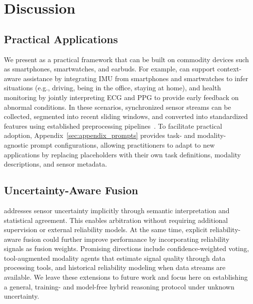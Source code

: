 \section{Discussion}
\label{sec:discussion}

\subsection{Practical Applications}
\label{sec:practical_applications}

We present \system{} as a practical framework that can be built on commodity devices such as smartphones, smartwatches, and earbuds. For example, \system{} can support context-aware assistance by integrating IMU from smartphones and smartwatches to infer situations (e.g., driving, being in the office, staying at home), and health monitoring by jointly interpreting ECG and PPG to provide early feedback on abnormal conditions. In these scenarios, synchronized sensor streams can be collected, segmented into recent sliding windows, and converted into standardized features using established preprocessing pipelines~\citep{wesad}. To facilitate practical adoption, Appendix~\ref{sec:appendix_prompts} provides task- and modality-agnostic prompt configurations, allowing practitioners to adapt \system{} to new applications by replacing placeholders with their own task definitions, modality descriptions, and sensor metadata.

\subsection{Uncertainty-Aware Fusion}

\system{} addresses sensor uncertainty implicitly through semantic interpretation and statistical agreement. This enables arbitration without requiring additional supervision or external reliability models. At the same time, explicit reliability-aware fusion could further improve performance by incorporating reliability signals as fusion weights. Promising directions include confidence-weighted voting, tool-augmented modality agents that estimate signal quality through data processing tools, and historical reliability modeling when data streams are available. We leave these extensions to future work and focus here on establishing a general, training- and model-free hybrid reasoning protocol under unknown uncertainty.